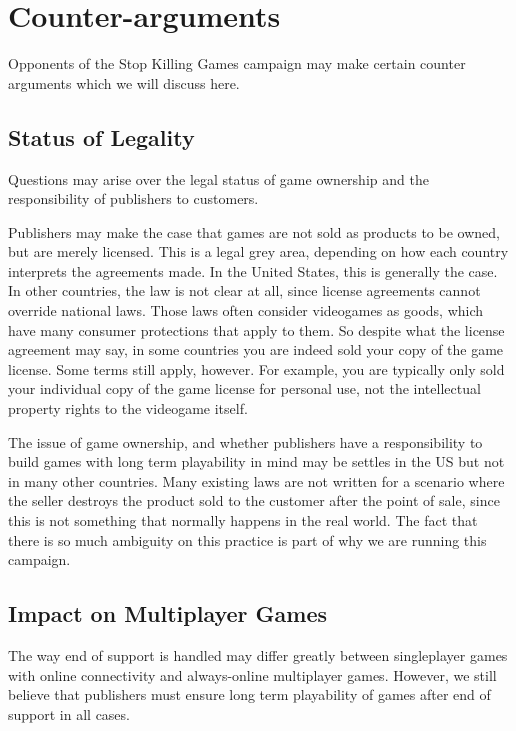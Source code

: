\section{Counter-arguments}
Opponents of the Stop Killing Games campaign may make certain counter arguments which we will discuss here.

\subsection{Status of Legality}
Questions may arise over the legal status of game ownership and the responsibility of publishers to customers.

Publishers may make the case that games are not sold as products to be owned, but are merely licensed.
This is a legal grey area, depending on how each country interprets the agreements made.
In the United States, this is generally the case\cn.
In other countries, the law is not clear at all, since license agreements cannot override national laws.
Those laws often consider videogames as goods, which have many consumer protections that apply to them\cn.
So despite what the license agreement may say, in some countries you are indeed sold your copy of the game license.
Some terms still apply, however.
For example, you are typically only sold your individual copy of the game license for personal use, not the intellectual property rights to the videogame itself.

The issue of game ownership, and whether publishers have a responsibility to build games with long term playability in mind may be settles in the US but not in many other countries\cn.
Many existing laws are not written for a scenario where the seller destroys the product sold to the customer after the point of sale,
since this is not something that normally happens in the real world.
The fact that there is so much ambiguity on this practice is part of why we are running this campaign.


\subsection{Impact on Multiplayer Games}
The way end of support is handled may differ greatly between singleplayer games with online connectivity and always-online multiplayer games.
However, we still believe that publishers must ensure long term playability of games after end of support in all cases.

